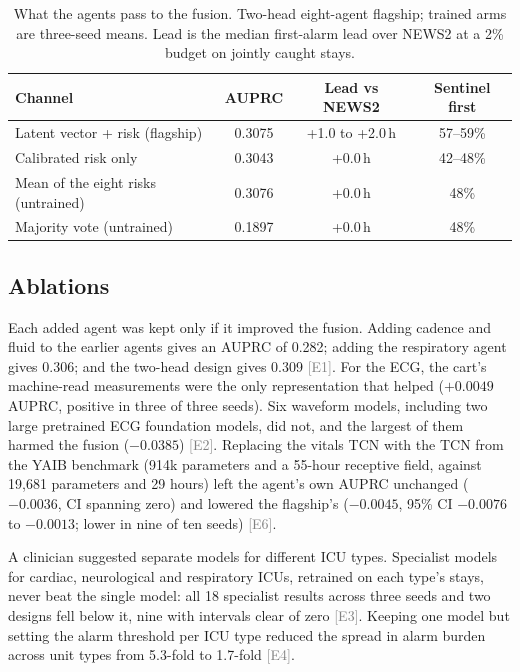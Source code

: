 \documentclass[11pt]{article}
\newcommand{\ev}[1]{\textcolor{gray}{\scriptsize[#1]}}   %
\begin{document}
\begin{table}[t]
\centering
\small
\caption{What the agents pass to the fusion. Two-head eight-agent flagship;
trained arms are three-seed means. Lead is the median first-alarm lead over
NEWS2 at a 2\% budget on jointly caught stays.}\label{tab:channel}
\begin{tabular}{@{}lccc@{}}
\toprule
Channel & AUPRC & Lead vs NEWS2 & Sentinel first \\
\midrule
Latent vector + risk (flagship) & 0.3075 & +1.0 to +2.0\,h & 57--59\% \\
Calibrated risk only & 0.3043 & +0.0\,h & 42--48\% \\
Mean of the eight risks (untrained) & 0.3076 & +0.0\,h & 48\% \\
Majority vote (untrained) & 0.1897 & +0.0\,h & 48\% \\
\bottomrule
\end{tabular}
\end{table}

\subsection{Ablations}
Each added agent was kept only if it improved the fusion. Adding cadence and
fluid to the earlier agents gives an AUPRC of 0.282; adding the respiratory
agent gives 0.306; and the two-head design gives 0.309 \ev{E1}. For the ECG, the
cart's machine-read measurements were the only representation that helped
($+0.0049$ AUPRC, positive in three of three seeds). Six waveform models,
including two large pretrained ECG foundation models, did not, and the largest
of them harmed the fusion ($-0.0385$) \ev{E2}. Replacing the vitals TCN with the
TCN from the YAIB benchmark (914k parameters and a 55-hour receptive field,
against 19{,}681 parameters and 29 hours) left the agent's own AUPRC unchanged
($-0.0036$, CI spanning zero) and lowered the flagship's ($-0.0045$, 95\% CI
$-0.0076$ to $-0.0013$; lower in nine of ten seeds) \ev{E6}.

A clinician suggested separate models for different ICU types. Specialist
models for cardiac, neurological and respiratory ICUs, retrained on each
type's stays, never beat the single model: all 18 specialist results across
three seeds and two designs fell below it, nine with intervals clear of zero
\ev{E3}. Keeping one model but setting the alarm threshold per ICU type reduced
the spread in alarm burden across unit types from 5.3-fold to 1.7-fold \ev{E4}.
\end{document}
